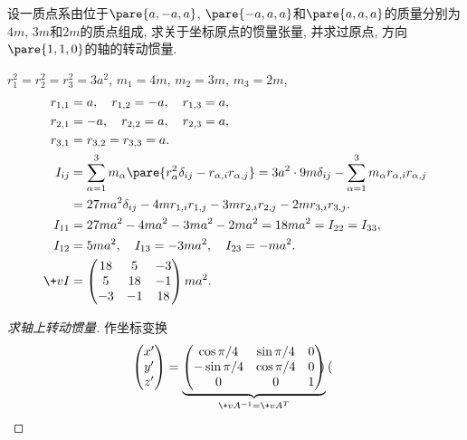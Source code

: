\documentclass[../LectureNotes.tex]{subfiles}
\begin{document}
\begin{sample}
    \begin{ex}
        设一质点系由位于$\pare{a,-a,a}$, $\pare{-a,a,a}$和$\pare{a,a,a}$的质量分别为$4m$, $3m$和$2m$的质点组成, 求关于坐标原点的惯量张量, 并求过原点, 方向$\pare{1,1,0}$的轴的转动惯量.
    \end{ex}
    \begin{solution}
        $r_1^2 = r_2^2 = r_3^2 = 3a^2$, $m_1 = 4m$, $m_2 = 3m$, $m_3 = 2m$,
        \begin{align*}
            r_{1,1} &= a,\quad r_{1,2} = -a,\quad r_{1,3} = a, \\
            r_{2,1} &= -a,\quad r_{2,2} = a,\quad r_{2,3} = a, \\
            r_{3,1} &= r_{3,2} = r_{3,3} = a. \\
            I_{ij} &= \sum_{\alpha=1}^3 m_\alpha \pare{r_\alpha^2 \delta_{ij} - r_{\alpha,i}r_{\alpha,j}} = 3a^2 \cdot 9m \delta_{ij} - \sum_{\alpha=1}^3 m_\alpha r_{\alpha,i} r_{\alpha,j} \\
            &= 27 ma^2 \delta_{ij} - 4mr_{1,i}r_{1,j} - 3mr_{2,i}r_{2,j} - 2mr_{3,i}r_{3,j}. \\
            I_{11} &= 27ma^2 - 4ma^2 - 3ma^2 - 2ma^2 = 18ma^2 = I_{22} = I_{33}, \\
            I_{12} &= 5ma^2,\quad I_{13} = -3ma^2,\quad I_{23} = -ma^2. \\
            \+vI &= \begin{pmatrix}
                18 & 5 & -3 \\
                5 & 18 & -1 \\
                -3 & -1 & 18
            \end{pmatrix}ma^2. \qedhere
        \end{align*}
    \end{solution}
    \begin{proof}[求轴上转动惯量]
        作坐标变换
        \begin{align*}
            \begin{pmatrix}
            x' \\ y' \\ z'
        \end{pmatrix} &= \underbrace{\begin{pmatrix}
            \cos \pi/4 & \sin \pi/4 & 0 \\
            -\sin\pi/4 & \cos\pi/4 & 0 \\
            0 & 0 & 1
        \end{pmatrix}}_{\+vA^{-1} = \+vA^T}\begin{pmatrix}

\end{pmatrix}
\end{align*}
\end{proof}
\end{sample}
\end{document}
